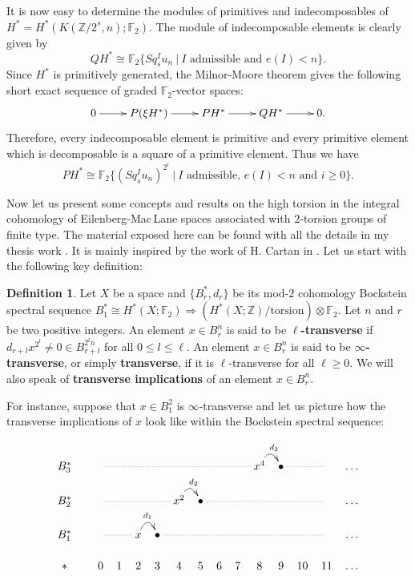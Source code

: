 \documentclass{amsart}
\theoremstyle{definition}
\newtheorem{defn}[thm]{Definition}
\theoremstyle{remark}
\newcommand{\Z}{\mathbb{Z}}
\newcommand{\F}{\mathbb{F}}
\renewcommand{\geq}{\geqslant}
\renewcommand{\leq}{\leqslant}
\begin{document}

It is now easy to determine the modules of primitives and indecomposables of $H^*=H^*(K(\Z/2^s,n);\F_2)$. The module of indecomposable elements is clearly given by
$$
QH^*\cong\F_2\{Sq^I_s u_n\ |\ \text{$I$ admissible and $e(I)<n$}\}.
$$
Since $H^*$ is primitively generated, the Milnor-Moore theorem gives the following short exact sequence of graded $\F_2$-vector spaces:
$$\xymatrix{
0\ar[r] &P(\xi H^*)\ar[r] &PH^*\ar[r] &QH^*\ar[r] &0.
}$$ Therefore, every indecomposable element is primitive and every primitive element which is decomposable is a square of a primitive element. Thus we have
$$
PH^*\cong\F_2\{(Sq^I_s u_n)^{2^i}\ |\ \text{$I$ admissible, $e(I)<n$ and $i\geq0$}\}.
$$

Now let us present some concepts and results on the high torsion in the integral cohomology of Eilenberg-Mac\,Lane spaces associated with $2$-torsion groups of finite type. The material exposed here can be found with all the details in my thesis work \cite{Cl02-PhD}. It is mainly inspired by the work of H. Cartan in \cite{Ca55}. Let us start with the following key definition:

\begin{defn}
Let $X$ be a space and $\{B^*_r,d_r\}$ be its mod-$2$ cohomology Bockstein spectral sequence $B_1^*\cong H^*(X;\F_2)\Longrightarrow (H^*(X;\Z)/\text{torsion})\otimes\F_2$. Let $n$ and $r$ be two positive integers. An element $x\in B^n_r$ is said to be {\bf $\ell$-transverse} if $d_{r+l}x^{2^l}\not=0\in B^{2^l n}_{r+l}$ for all $0\leq l\leq\ell$. An element $x\in B^n_r$ is said to be {\bf $\infty$-transverse}, or simply {\bf transverse}, if it is $\ell$-transverse for all $\ell\geq0$. We will also speak of {\bf transverse implications} of an element $x\in B^n_r$.
\end{defn}

\newpage
For instance, suppose that $x\in B_1^2$ is $\infty$-transverse and let us picture how the transverse implications of $x$ look like within the Bockstein spectral sequence:

$$\xymatrix@C=0.2cm@R=0.5truecm{
B_3^* &&\ar@{.}[rrrrrrrr] & & & & & & & &x^4\ar@/^0.4truecm/[r]^-{d_3} &\bullet\ar@{.}[rr] & &  &\dots\\
B_2^* &&\ar@{.}[rrrr] & & & &x^2\ar@/^0.4truecm/[r]^-{d_2} &\bullet\ar@{.}[rrrrrr] & & & & & &  &\dots\\
B_1^* &&\ar@{.}[rr] & &x\ar@/^0.4truecm/[r]^-{d_1} &\bullet\ar@{.}[rrrrrrrr] & & & & & & & & &\dots\\
{*}&&0 &1 &2 &3 &4 &5 &6 &7 &8 &9 &10 &11 &\dots
}$$
\end{document}
